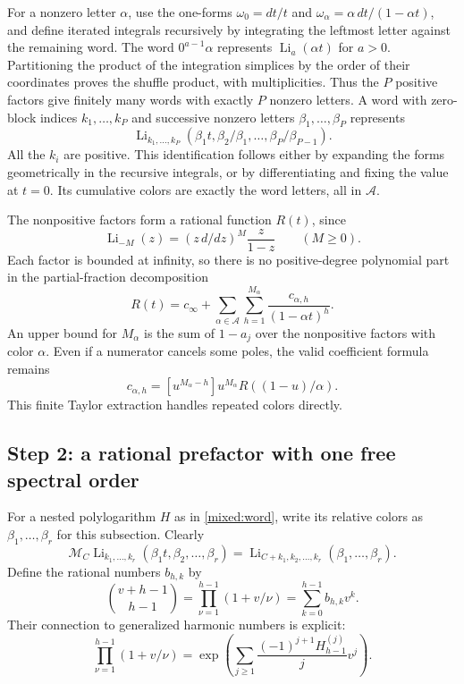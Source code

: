 \documentclass[11pt]{article}
\numberwithin{equation}{section}
\theoremstyle{plain}
\theoremstyle{definition}
\theoremstyle{remark}
\DeclareMathOperator{\Li}{Li}
\newcommand{\Mcal}{\mathcal M}
\begin{document}
For a nonzero letter $\alpha$, use the one-forms
$\omega_0=dt/t$ and $\omega_\alpha=\alpha\,dt/(1-\alpha t)$,
and define iterated integrals recursively by integrating the leftmost
letter against the remaining word. The word
$0^{a-1}\alpha$ represents $\Li_a(\alpha t)$ for $a>0$.
Partitioning the product of the integration simplices by the order
of their coordinates proves the shuffle product, with multiplicities.
Thus the $P$ positive factors give finitely many words with exactly
$P$ nonzero letters. A word with zero-block indices $k_1,\ldots,k_P$
and successive nonzero letters $\beta_1,\ldots,\beta_P$ represents
\begin{equation}\label{mixed:word}
 \Li_{k_1,\ldots,k_P}
       (\beta_1t,\beta_2/\beta_1,\ldots,\beta_P/\beta_{P-1}).
\end{equation}
All the $k_i$ are positive. This identification follows either by
expanding the forms geometrically in the recursive integrals, or by
differentiating and fixing the value at $t=0$. Its cumulative colors
are exactly the word letters, all in $\mathcal A$.

The nonpositive factors form a rational function $R(t)$, since
\[
 \Li_{-M}(z)=(z\,d/dz)^M\frac{z}{1-z}\qquad(M\ge0).
\]
Each factor is bounded at infinity, so there is no positive-degree
polynomial part in the partial-fraction decomposition
\begin{equation}\label{mixed:R}
 R(t)=c_\infty+\sum_{\alpha\in\mathcal A}\sum_{h=1}^{M_\alpha}
                         \frac{c_{\alpha,h}}{(1-\alpha t)^h}.
\end{equation}
An upper bound for $M_\alpha$ is the sum of $1-a_j$ over the
nonpositive factors with color $\alpha$. Even if a numerator cancels
some poles, the valid coefficient formula remains
\begin{equation}\label{mixed:partialcoeff}
 c_{\alpha,h}=[u^{M_\alpha-h}]
                 u^{M_\alpha}R((1-u)/\alpha).
\end{equation}
This finite Taylor extraction handles repeated colors directly.

\subsection{Step 2: a rational prefactor with one free spectral order}

For a nested polylogarithm $H$ as in \eqref{mixed:word}, write its
relative colors as $\beta_1,\ldots,\beta_r$ for this subsection.
Clearly
\[
 \Mcal_C\Li_{k_1,\ldots,k_r}(\beta_1t,\beta_2,\ldots,\beta_r)
   =\Li_{C+k_1,k_2,\ldots,k_r}(\beta_1,\ldots,\beta_r).
\]
Define the rational numbers $b_{h,k}$ by
\begin{equation}\label{mixed:b}
 \binom{v+h-1}{h-1}=
       \prod_{\nu=1}^{h-1}(1+v/\nu)
       =\sum_{k=0}^{h-1}b_{h,k}v^k.
\end{equation}
Their connection to generalized harmonic numbers is explicit:
\[
 \prod_{\nu=1}^{h-1}(1+v/\nu)
   =\exp\left(\sum_{j\ge1}
          \frac{(-1)^{j+1}H_{h-1}^{(j)}}{j}v^j\right).
\]
\end{document}
